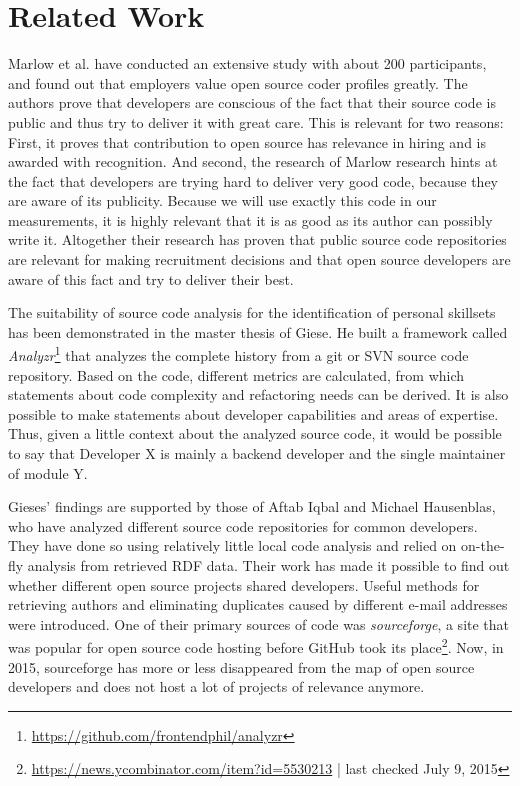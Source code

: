 \section{Related Work}
Marlow et al.\cite{md:2013} have conducted an extensive study with about 200 participants, and found out that employers value open source coder profiles greatly.
The authors prove that developers are conscious of the fact that their source code is public and thus try to deliver it with great care. This is relevant for two reasons: First, it proves that contribution to open source has relevance in hiring and is awarded with recognition. And second, the research of Marlow research hints at the fact that developers are trying hard to deliver very good code, because they are aware of its publicity. Because we will use exactly this code in our measurements, it is highly relevant that it is as good as its author can possibly write it. Altogether their research has proven that public source code repositories are relevant for making recruitment decisions and that open source developers are aware of this fact and try to deliver their best.
\newline

The suitability of source code analysis for the identification of personal skillsets has been demonstrated in the master thesis of Giese\cite{pg:2014}. He built a framework called \textit{Analyzr}\footnote{\url{https://github.com/frontendphil/analyzr}} that analyzes the complete history from a git or SVN source code repository. Based on the code, different metrics are calculated, from which statements about code complexity and refactoring needs can be derived. It is also possible to make statements about developer capabilities and areas of expertise. Thus, given a little context about the analyzed source code, it would be possible to say that \glqq Developer X is mainly a backend developer and the single maintainer of module Y\grqq.

Gieses' findings are supported by those of Aftab Iqbal and Michael Hausenblas, who have analyzed different source code repositories for common developers\cite{ih:2012}. They have done so using relatively little local code analysis and relied on on-the-fly analysis from retrieved RDF data. Their work has made it possible to find out whether different open source projects shared developers. Useful methods for retrieving authors and eliminating duplicates caused by different e-mail addresses were introduced. One of their primary sources of code was \textit{sourceforge}, a site that was popular for open source code hosting before GitHub took its place\footnote{\url{https://news.ycombinator.com/item?id=5530213} | last checked July 9, 2015}. Now, in 2015, sourceforge has more or less disappeared from the map of open source developers and does not host a lot of projects of relevance anymore.
\newline

